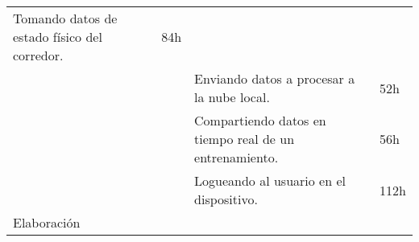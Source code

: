 \begin{longtable}[c]{@{}llll@{}}
\begin{minipage}[t]{0.58\columnwidth}
Tomando datos de estado físico del corredor.
\end{minipage} & \begin{minipage}[t]{0.12\columnwidth}\raggedright
84h
\end{minipage}
\\\noalign{\medskip}
\begin{minipage}[t]{0.17\columnwidth}\raggedright
\end{minipage} & \begin{minipage}[t]{0.12\columnwidth}\raggedright
\end{minipage} & \begin{minipage}[t]{0.58\columnwidth}\raggedright
Enviando datos a procesar a la nube local.
\end{minipage} & \begin{minipage}[t]{0.12\columnwidth}\raggedright
52h
\end{minipage}
\\\noalign{\medskip}
\begin{minipage}[t]{0.17\columnwidth}\raggedright
\end{minipage} & \begin{minipage}[t]{0.12\columnwidth}\raggedright
\end{minipage} & \begin{minipage}[t]{0.58\columnwidth}\raggedright
Compartiendo datos en tiempo real de un entrenamiento.
\end{minipage} & \begin{minipage}[t]{0.12\columnwidth}\raggedright
56h
\end{minipage}
\\\noalign{\medskip}
\begin{minipage}[t]{0.17\columnwidth}\raggedright
\end{minipage} & \begin{minipage}[t]{0.12\columnwidth}\raggedright
\end{minipage} & \begin{minipage}[t]{0.58\columnwidth}\raggedright
Logueando al usuario en el dispositivo.
\end{minipage} & \begin{minipage}[t]{0.12\columnwidth}\raggedright
112h
\end{minipage}
\\\noalign{\medskip}
\begin{minipage}[t]{0.17\columnwidth}\raggedright
Elaboración
\end{minipage} & \begin{minipage}[t]{0.12\columnwidth}\raggedright

\end{minipage}
\end{longtable}
